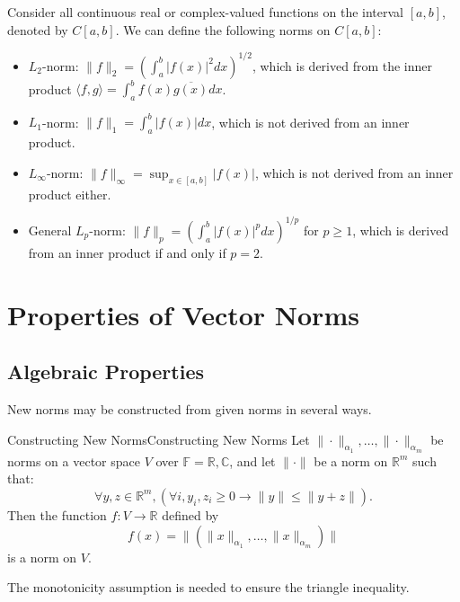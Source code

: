 \documentclass[../main.tex]{subfiles}
\begin{document}
Consider all continuous real or complex-valued functions on the interval $[a, b]$, denoted by $C[a, b]$. We can define the following norms on $C[a, b]$:
\begin{itemize}
  \item $L_2$-norm: $\displaystyle \|f\|_2 = \left( \int_a^b |f(x)|^2 dx \right)^{1/2}$, which is derived from the inner product $\langle f, g \rangle = \int_a^b f(x) \overline{g(x)} dx$.
  \item $L_1$-norm: $\displaystyle \|f\|_1 = \int_a^b |f(x)| dx$, which is not derived from an inner product.
  \item $L_\infty$-norm: $\displaystyle \|f\|_\infty = \sup_{x \in [a, b]} |f(x)|$, which is not derived from an inner product either.
  \item General $L_p$-norm: $\displaystyle \|f\|_p = \left( \int_a^b |f(x)|^p dx \right)^{1/p}$ for $p \geq 1$, which is derived from an inner product if and only if $p = 2$.
\end{itemize}

\section{Properties of Vector Norms}
\subsection{Algebraic Properties}
New norms may be constructed from given norms in several ways.

\begin{theorem}{Constructing New Norms}{Constructing New Norms}
  Let $\|\cdot\|_{\alpha_1}, \ldots , \|\cdot\|_{\alpha_m}$ be norms on a vector space $V$ over $\mathbb{F} = \mathbb{R}, \mathbb{C}$, and let $\| \cdot \|$ be a norm on $\mathbb{R}^m$ such that:
  \begin{equation*}
    \forall y,z \in \mathbb{R}^m, (\forall i, y_i, z_i \geq 0 \rightarrow \|y\| \leq \|y + z\|).
  \end{equation*}
  Then the function $f: V \to \mathbb{R}$ defined by
  \begin{equation}
    f(x) = \|(\|x\|_{\alpha_1}, \ldots, \|x\|_{\alpha_m})\|
  \end{equation}
  is a norm on $V$.
\end{theorem}
The monotonicity assumption is needed to ensure the triangle inequality.
\end{document}

